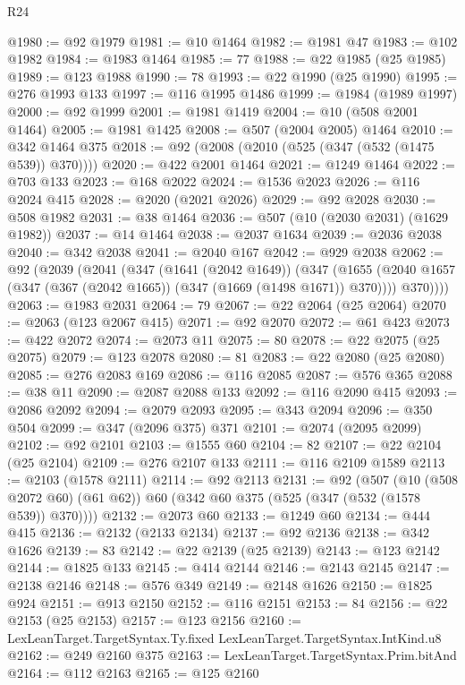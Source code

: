 \begin{lexlean}{R24}
\begin{coremodule}
{{{{{{{{{{{{{{{{{{{{{{{{{{{{{{{{{{{{{{{{{{{{{{{{{{{{{{{{{{{{{{{{{{{{{{{{{{{{{{{{{{{{{{{{{{{{{{{{{{{{{{{{{{{{{{{{{{{{{{{{{{{{{{{{{{{{{{{{{{{{{{{{{{{{{{{{{{{{{{{{{{{{{{{{{{{{{{{{{{{{{{{{{{{{{{{{{{{@1980 := @92 @1979
@1981 := @10 @1464
@1982 := @1981 @47
@1983 := @102 @1982
@1984 := @1983 @1464
@1985 := 77
@1988 := @22 @1985 (@25 @1985)
@1989 := @123 @1988
@1990 := 78
@1993 := @22 @1990 (@25 @1990)
@1995 := @276 @1993 @133
@1997 := @116 @1995 @1486
@1999 := @1984 (@1989 @1997)
@2000 := @92 @1999
@2001 := @1981 @1419
@2004 := @10 (@508 @2001 @1464)
@2005 := @1981 @1425
@2008 := @507 (@2004 @2005) @1464
@2010 := @342 @1464 @375
@2018 := @92 (@2008 (@2010 (@525 (@347 (@532 (@1475 @539)) @370))))
@2020 := @422 @2001 @1464
@2021 := @1249 @1464
@2022 := @703 @133
@2023 := @168 @2022
@2024 := @1536 @2023
@2026 := @116 @2024 @415
@2028 := @2020 (@2021 @2026)
@2029 := @92 @2028
@2030 := @508 @1982
@2031 := @38 @1464
@2036 := @507 (@10 (@2030 @2031) (@1629 @1982))
@2037 := @14 @1464
@2038 := @2037 @1634
@2039 := @2036 @2038
@2040 := @342 @2038
@2041 := @2040 @167
@2042 := @929 @2038
@2062 := @92
    (@2039
      (@2041
        (@347
          (@1641 (@2042 @1649))
          (@347
            (@1655 (@2040 @1657 (@347 (@367 (@2042 @1665)) (@347 (@1669 (@1498 @1671)) @370))))
            @370))))
@2063 := @1983 @2031
@2064 := 79
@2067 := @22 @2064 (@25 @2064)
@2070 := @2063 (@123 @2067 @415)
@2071 := @92 @2070
@2072 := @61 @423
@2073 := @422 @2072
@2074 := @2073 @11
@2075 := 80
@2078 := @22 @2075 (@25 @2075)
@2079 := @123 @2078
@2080 := 81
@2083 := @22 @2080 (@25 @2080)
@2085 := @276 @2083 @169
@2086 := @116 @2085
@2087 := @576 @365
@2088 := @38 @11
@2090 := @2087 @2088 @133
@2092 := @116 @2090 @415
@2093 := @2086 @2092
@2094 := @2079 @2093
@2095 := @343 @2094
@2096 := @350 @504
@2099 := @347 (@2096 @375) @371
@2101 := @2074 (@2095 @2099)
@2102 := @92 @2101
@2103 := @1555 @60
@2104 := 82
@2107 := @22 @2104 (@25 @2104)
@2109 := @276 @2107 @133
@2111 := @116 @2109 @1589
@2113 := @2103 (@1578 @2111)
@2114 := @92 @2113
@2131 := @92
    (@507
      (@10 (@508 @2072 @60) (@61 @62))
      @60
      (@342 @60 @375 (@525 (@347 (@532 (@1578 @539)) @370))))
@2132 := @2073 @60
@2133 := @1249 @60
@2134 := @444 @415
@2136 := @2132 (@2133 @2134)
@2137 := @92 @2136
@2138 := @342 @1626
@2139 := 83
@2142 := @22 @2139 (@25 @2139)
@2143 := @123 @2142
@2144 := @1825 @133
@2145 := @414 @2144
@2146 := @2143 @2145
@2147 := @2138 @2146
@2148 := @576 @349
@2149 := @2148 @1626
@2150 := @1825 @924
@2151 := @913 @2150
@2152 := @116 @2151
@2153 := 84
@2156 := @22 @2153 (@25 @2153)
@2157 := @123 @2156
@2160 := LexLeanTarget.TargetSyntax.Ty.fixed LexLeanTarget.TargetSyntax.IntKind.u8
@2162 := @249 @2160 @375
@2163 := LexLeanTarget.TargetSyntax.Prim.bitAnd
@2164 := @112 @2163
@2165 := @125 @2160
}}}}}}}}}}}}}}}}}}}}}}}}}}}}}}}}}}}}}}}}}}}}}}}}}}}}}}}}}}}}}}}}}}}}}}}}}}}}}}}}}}}}}}}}}}}}}}}}}}}}}}}}}}}}}}}}}}}}}}}}}}}}}}}}}}}}}}}}}}}}}}}}}}}}}}}}}}}}}}}}}}}}}}}}}}}}}}}}}}}}}}}}}}}}}}}}}}}
\end{coremodule}
\end{lexlean}
